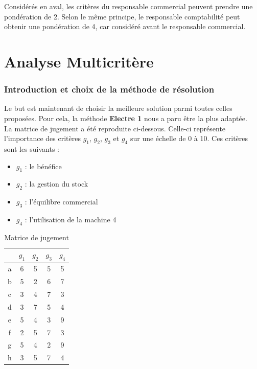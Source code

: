 \documentclass[paper=a4, fontsize=11pt]{report}
\numberwithin{equation}{section}		%
\numberwithin{figure}{section}			%
\numberwithin{table}{section}				%
\begin{document}
Considérés en aval, les critères du responsable commercial peuvent prendre une pondération de 2. Selon le même principe, le responsable comptabilité peut obtenir une pondération de 4, car considéré avant le responsable commercial.


\part{Analyse Multicritère}
\setcounter{section}{0}


\section{Introduction et choix de la méthode de résolution}
Le but est maintenant de choisir la meilleure solution parmi toutes celles proposées. Pour cela, la méthode \textbf{Electre 1} nous a paru être la plus adaptée.\\

La matrice de jugement a été reproduite ci-dessous. Celle-ci représente l'importance des critères $g_1$, $g_2$, $g_3$ et $g_4$ sur une échelle de 0 à 10. Ces critères sont les suivants : 

\begin{multicols}{2}

\begin{itemize}
\item $g_1$ : le bénéfice
\item $g_2$ : la gestion du stock
\item $g_3$ : l'équilibre commercial
\item $g_4$ : l'utilisation de la machine 4
\end{itemize}


\begin{table}[H]
\begin{center}
\begin{tabular}{c|cccc}
 & $g_1$ & $g_2$ & $g_3$ & $g_4$ \\ 
\hline 
a & 6 & 5 & 5 & 5 \\ 
b & 5 & 2 & 6 & 7 \\ 
c & 3 & 4 & 7 & 3 \\ 
d & 3 & 7 & 5 & 4 \\ 
e & 5 & 4 & 3 & 9 \\ 
f & 2 & 5 & 7 & 3 \\ 
g & 5 & 4 & 2 & 9 \\ 
h & 3 & 5 & 7 & 4 \\ 
\end{tabular}
\caption{Matrice de jugement} 
\end{center}
\end{table}

\end{multicols}
\end{document}
